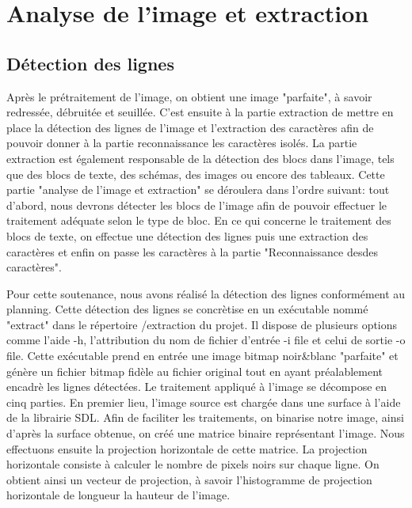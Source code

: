 \documentclass[]{report}
\begin{document}





	\chapter{Analyse de l'image et extraction} %
	\label{cha:analyse_de_l'image_et_extraction}

    \section{D\'etection des lignes} %
    \label{sec:d'etection_des_lignes}
      Après le prétraitement de l'image, on obtient une image "parfaite", à savoir redressée, débruitée et seuillée. C'est ensuite à la partie extraction de mettre en place la détection des lignes de l'image et l'extraction des caractères afin de pouvoir donner à la partie reconnaissance les caractères isolés. La partie extraction est également responsable de la détection des blocs dans l'image, tels que des blocs de texte, des schémas, des images ou encore des tableaux.
      Cette partie "analyse de l'image et extraction" se déroulera dans l'ordre suivant: tout d'abord, nous devrons détecter les blocs de l'image afin de pouvoir effectuer le traitement adéquate selon le type de bloc. En ce qui concerne le traitement des blocs de texte, on effectue une détection des lignes puis une extraction des caractères et enfin on passe les caractères à la partie "Reconnaissance desdes caractères".

      Pour cette soutenance, nous avons réalisé la détection des lignes conformément au planning. Cette détection des lignes se concrètise en un exécutable nommé "extract" dans le répertoire /extraction du projet. Il dispose de plusieurs options comme l'aide -h, l'attribution du nom de fichier d'entrée -i file et celui de sortie -o file. Cette exécutable prend en entrée une image bitmap noir&blanc "parfaite" et génère un fichier bitmap fidèle au fichier original tout en ayant préalablement encadrè les lignes détectées.
      Le traitement appliqué à l'image se décompose en cinq parties. En premier lieu, l'image source est chargée dans une surface à l'aide de la librairie SDL. Afin de faciliter les traitements, on binarise notre image, ainsi d'après la surface obtenue, on créé une matrice binaire représentant l'image. Nous effectuons ensuite la projection horizontale de cette matrice. La projection horizontale consiste à calculer le nombre de pixels noirs sur chaque ligne. On obtient ainsi un vecteur de projection, à savoir l'histogramme de projection horizontale de longueur la hauteur de l'image.
\end{document}
